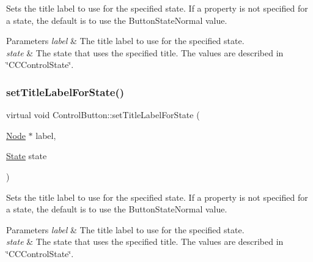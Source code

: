 Sets the title label to use for the specified state. If a property is not specified for a state, the default is to use the Button\+State\+Normal value.


\begin{DoxyParams}{Parameters}
{\em label} & The title label to use for the specified state. \\
\hline
{\em state} & The state that uses the specified title. The values are described in \char`\"{}\+C\+C\+Control\+State\char`\"{}. \\
\hline
\end{DoxyParams}
\mbox{\label{classControlButton_a51963a12c2ace5ffc3a61587a20f406d}} 
\subsubsection{\texorpdfstring{set\+Title\+Label\+For\+State()}{setTitleLabelForState()}\hspace{0.1cm}{\footnotesize\ttfamily [2/2]}}
{\footnotesize\ttfamily virtual void Control\+Button\+::set\+Title\+Label\+For\+State (\begin{DoxyParamCaption}\item[{\hyperlink{classNode}{Node} $\ast$}]{label,  }\item[{\hyperlink{classControl_a89e9598cd785841ac91cff3c4798c469}{State}}]{state }\end{DoxyParamCaption})\hspace{0.3cm}{\ttfamily [virtual]}}

Sets the title label to use for the specified state. If a property is not specified for a state, the default is to use the Button\+State\+Normal value.


\begin{DoxyParams}{Parameters}
{\em label} & The title label to use for the specified state. \\
\hline
{\em state} & The state that uses the specified title. The values are described in \char`\"{}\+C\+C\+Control\+State\char`\"{}. \\
\hline
\end{DoxyParams}
\mbox{\label{classControlButton_a3f7857c3ce4bec5b375db1a6efea5920}} 
